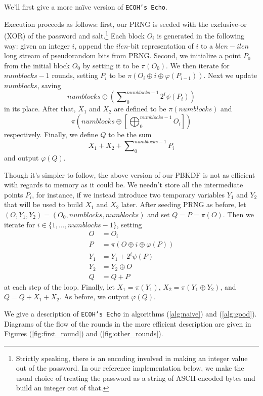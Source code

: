 We'll first give a more na\"ive version of \texttt{ECOH's Echo}.

Execution proceeds as follows: first, our PRNG is seeded with the exclusive-or
    (XOR) of the password and salt.\footnote{Strictly speaking, there is an
    encoding involved in making an integer value out of the password. In our
    reference implementation below, we make the usual choice of treating the
    password as a string of ASCII-encoded bytes and build an integer out of
    that.}
Each block $O_i$ is generated in the following way: given an integer $i$,
    append the $ilen$-bit representation of $i$ to a $blen - ilen$ long stream
    of pseudorandom bits from PRNG.
Second, we initialize a point $P_0$ from the initial block $O_0$ by setting it
    to be $\pi(O_0)$.
We then iterate for $numblocks - 1$ rounds, setting $P_i$ to be $\pi(O_i \oplus
    i \oplus \varphi(P_{i-1}))$.
Next we update $numblocks$, saving
\[
numblocks \oplus \left(\sum\nolimits_0^{numblocks - 1}2^i\psi(P_i)\right)
\]
    in its place.
After that, $X_1$ and $X_2$ are defined to be $\pi(numblocks)$ and
\[
\pi\left(numblocks \oplus
    \left[\bigoplus\nolimits_0^{numblocks-1} O_i\right]
\right)
\]
    respectively.
Finally, we define $Q$ to be the sum
\[
X_1 + X_2 + \sum\nolimits_0^{numblocks-1}P_i
\]
    and output $\varphi(Q)$.

Though it's simpler to follow, the above version of our PBKDF is not as
    efficient with regards to memory as it could be.
We needn't store all the intermediate points $P_i$, for instance, if we instead
    introduce two temporary variables $Y_1$ and $Y_2$ that will be used to
    build $X_1$ and $X_2$ later.
After seeding PRNG as before, let $(O, Y_1, Y_2) = (O_0, numblocks, numblocks)$
    and set $Q = P = \pi(O)$.
Then we iterate for $i \in \{1, \ldots, numblocks - 1\}$, setting
\begin{align*}
O   &=  O_i\\
P   &=  \pi(O \oplus i \oplus \varphi(P))\\
Y_1 &=  Y_1 + 2^i\psi(P)\\
Y_2 &=  Y_2 \oplus O\\
Q   &=  Q + P
\end{align*}
    at each step of the loop.
Finally, let $X_1 = \pi(Y_1)$, $X_2 = \pi(Y_1 \oplus Y_2)$, and $Q = Q + X_1 +
    X_2$.
As before, we output $\varphi(Q)$.

We give a description of \texttt{ECOH's Echo} in algorithms (\ref{alg:naive})
    and (\ref{alg:good}).
Diagrams of the flow of the rounds in the more efficient description are given
    in Figures (\ref{fig:first_round}) and (\ref{fig:other_rounds}).

